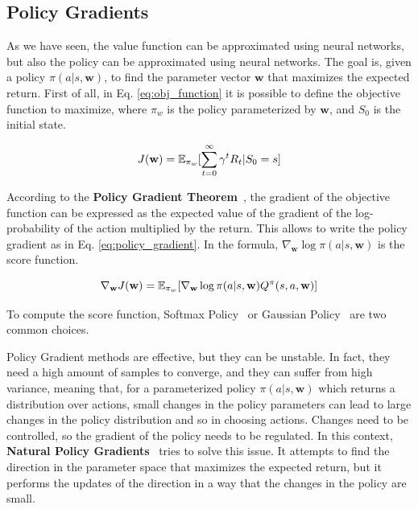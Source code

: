 \subsection{Policy Gradients}\label{subsec:policy_gradients}
As we have seen, the value function can be approximated using neural networks, but also the policy can be approximated using neural networks.
The goal is, given a policy $\pi(a|s, \textbf{w})$, to find the parameter vector $\textbf{w}$ that maximizes the expected return.
First of all, in Eq. \ref{eq:obj_function} it is possible to define the objective function to maximize, where $\pi_w$ is the policy parameterized by $\textbf{w}$, and $S_0$ is the initial state.

\begin{equation} \label{eq:obj_function}
    J(\textbf{w}) = \operatorname{\mathbb{E}}_{\pi_w}[\sum_{t=0}^{\infty} \gamma^t R_t | S_0 = s]
\end{equation}

According to the \textbf{Policy Gradient Theorem}~\citep{sutton1999policy}, the gradient of the objective function can be expressed as the expected value of the gradient of the log-probability of the action multiplied by the return.
This allows to write the policy gradient as in Eq. \ref{eq:policy_gradient}.
In the formula, $\nabla_{\textbf{w}} \log \pi(a|s, \textbf{w})$ is the score function.

\begin{equation} \label{eq:policy_gradient}
    \nabla_{\textbf{w}} J(\textbf{w}) = \operatorname{\mathbb{E}}_{\pi_w}[\nabla_{\textbf{w}} \log \pi(a|s, \textbf{w}) Q^{\pi}(s, a, \textbf{w})]
\end{equation}


To compute the score function, Softmax Policy~\citep{williams1992simple} or Gaussian Policy~\citep{lillicrap2015continuous} are two common choices.

Policy Gradient methods are effective, but they can be unstable.
In fact, they need a high amount of samples to converge, and they can suffer from high variance, meaning that, for a parameterized policy $\pi(a|s, \textbf{w})$ which returns a distribution over actions, small changes in the policy parameters can lead to large changes in the policy distribution and so in choosing actions.
Changes need to be controlled, so the gradient of the policy needs to be regulated.
In this context, \textbf{Natural Policy Gradients}~\citep{kakade2001natural} tries to solve this issue.
It attempts to find the direction in the parameter space that maximizes the expected return, but it performs the updates of the direction in a way that the changes in the policy are small.


